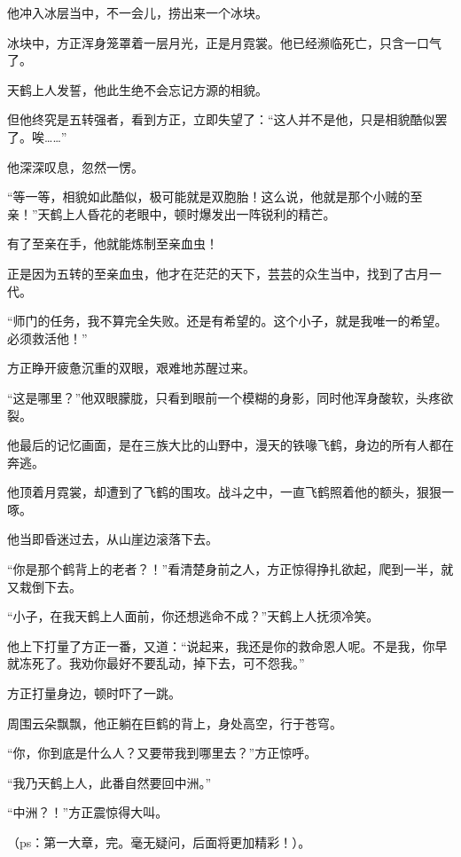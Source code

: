 \begin{this_body}
他冲入冰层当中，不一会儿，捞出来一个冰块。

冰块中，方正浑身笼罩着一层月光，正是月霓裳。他已经濒临死亡，只含一口气了。

天鹤上人发誓，他此生绝不会忘记方源的相貌。

但他终究是五转强者，看到方正，立即失望了：“这人并不是他，只是相貌酷似罢了。唉……”

他深深叹息，忽然一愣。

“等一等，相貌如此酷似，极可能就是双胞胎！这么说，他就是那个小贼的至亲！”天鹤上人昏花的老眼中，顿时爆发出一阵锐利的精芒。

有了至亲在手，他就能炼制至亲血虫！

正是因为五转的至亲血虫，他才在茫茫的天下，芸芸的众生当中，找到了古月一代。

“师门的任务，我不算完全失败。还是有希望的。这个小子，就是我唯一的希望。必须救活他！”

方正睁开疲惫沉重的双眼，艰难地苏醒过来。

“这是哪里？”他双眼朦胧，只看到眼前一个模糊的身影，同时他浑身酸软，头疼欲裂。

他最后的记忆画面，是在三族大比的山野中，漫天的铁喙飞鹤，身边的所有人都在奔逃。

他顶着月霓裳，却遭到了飞鹤的围攻。战斗之中，一直飞鹤照着他的额头，狠狠一啄。

他当即昏迷过去，从山崖边滚落下去。

“你是那个鹤背上的老者？！”看清楚身前之人，方正惊得挣扎欲起，爬到一半，就又栽倒下去。

“小子，在我天鹤上人面前，你还想逃命不成？”天鹤上人抚须冷笑。

他上下打量了方正一番，又道：“说起来，我还是你的救命恩人呢。不是我，你早就冻死了。我劝你最好不要乱动，掉下去，可不怨我。”

方正打量身边，顿时吓了一跳。

周围云朵飘飘，他正躺在巨鹤的背上，身处高空，行于苍穹。

“你，你到底是什么人？又要带我到哪里去？”方正惊呼。

“我乃天鹤上人，此番自然要回中洲。”

“中洲？！”方正震惊得大叫。

（ps：第一大章，完。毫无疑问，后面将更加精彩！）。

\end{this_body}


